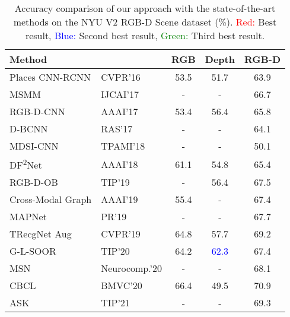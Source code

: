 \begin{table}[!h]
	\caption{Accuracy comparison of our approach with the state-of-the-art methods on the NYU V2 RGB-D Scene dataset (\%). \textcolor{red}{Red:} Best result, \textcolor{blue}{Blue:} Second best result, \textcolor{green}{Green:} Third best result.}
	\begin{center}
		\setlength{\tabcolsep}{0.9em} %
		\def\arraystretch{1.2}
		\begin{adjustbox}{width=\columnwidth}
			\begin{tabular}{ llccc }
				\hline
				Method 												&				& RGB 				& Depth 			& RGB-D \\ \hline \hline
				Places CNN-RCNN \citep{2016_CVPR_Wang}         		& CVPR'16		& 53.5 				& 51.7 	 			& 63.9	\\
				MSMM \citep{2017_IJCAI_Song}         				& IJCAI'17		& - 	           	& - 	        	& 66.7 	\\
				RGB-D-CNN \citep{2017_AAAI_Song}         			& AAAI'17		& 53.4 	           	& 56.4 	        	& 65.8 	\\
				D-BCNN \citep{2017_RAS_Zaki}         				& RAS'17		& - 	           	& - 	        	& 64.1 	\\
				MDSI-CNN \citep{2018_TPAMI_Asif}         			& TPAMI'18		& -	           		& - 	        	& 50.1 	\\
				DF\textsuperscript{2}Net \citep{2018_AAAI_Li} 		& AAAI'18		& 61.1 	           	& 54.8 	        	& 65.4  \\
				RGB-D-OB \citep{2019_TIP_Song}         				& TIP'19		& - 	           	& 56.4 	        	& 67.5 	\\
				Cross-Modal Graph \citep{2019_AAAI_Yuan}        	& AAAI'19		& 55.4 	           	& - 	        	& 67.4	\\
				MAPNet \citep{2019_PR_Li} 							& PR'19			& - 	           	& - 	        	& 67.7 	\\
				TRecgNet Aug \citep{2019_CVPR_Du}         			& CVPR'19		& 64.8 				& 57.7 				& 69.2 	\\
				G-L-SOOR \citep{2020_TIP_Song}         				& TIP'20		& 64.2 	           	& \bftab\textcolor{blue}{62.3} 	        	& 67.4	\\
				MSN \citep{2020_Neuroc_Xiong}         				& Neurocomp.'20	& - 	           	& - 	        	& 68.1	\\
				CBCL \citep{2020_BMVC_Ayub}         				& BMVC'20		& 66.4 				& 49.5 	        	& 70.9 	\\ 
				ASK \citep{2021_TIP_Xiong}  						& TIP'21		& - 				& -	        		& 69.3 	\\

\end{tabular}
\end{adjustbox}
\end{center}
\end{table}
